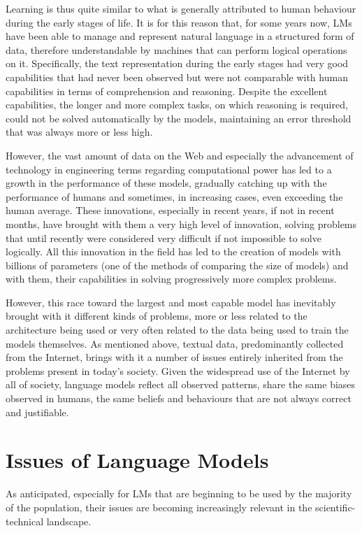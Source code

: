 Learning is thus quite similar to what is generally attributed to human behaviour during the early stages of life. It is for this reason that, for some years now, LMs have been able to manage and represent natural language in a structured form of data, therefore understandable by machines that can perform logical operations on it. Specifically, the text representation during the early stages had very good capabilities that had never been observed but were not comparable with human capabilities in terms of comprehension and reasoning. Despite the excellent capabilities, the longer and more complex tasks, on which reasoning is required, could not be solved automatically by the models, maintaining an error threshold that was always more or less high.

However, the vast amount of data on the Web and especially the advancement of technology in engineering terms regarding computational power has led to a growth in the performance of these models, gradually catching up with the performance of humans and sometimes, in increasing cases, even exceeding the human average. These innovations, especially in recent years, if not in recent months, have brought with them a very high level of innovation, solving problems that until recently were considered very difficult if not impossible to solve logically. All this innovation in the field has led to the creation of models with billions of parameters (one of the methods of comparing the size of models) and with them, their capabilities in solving progressively more complex problems.

However, this race toward the largest and most capable model has inevitably brought with it different kinds of problems, more or less related to the architecture being used or very often related to the data being used to train the models themselves. As mentioned above, textual data, predominantly collected from the Internet, brings with it a number of issues entirely inherited from the problems present in today's society. Given the widespread use of the Internet by all of society, language models reflect all observed patterns, share the same biases observed in humans, the same beliefs and behaviours that are not always correct and justifiable.


\section{Issues of Language Models}

As anticipated, especially for LMs that are beginning to be used by the majority of the population, their issues are becoming increasingly relevant in the scientific-technical landscape.

